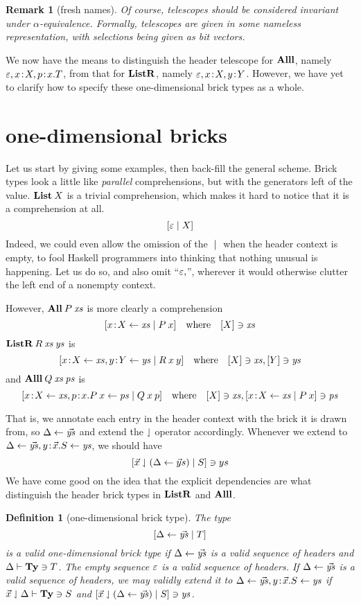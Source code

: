 \documentclass{article}
\newtheorem{defn}[thm]{Definition}
\newtheorem{rem}{Remark}[thm]
\begin{document}
\begin{rem}[fresh names]
  Of course, telescopes should be considered invariant under $\alpha$-equivalence. Formally, telescopes are given in some nameless representation, with selections being given as bit vectors.
\end{rem}

We now have the means to distinguish the header telescope for $\mathbf{Alll}$, namely $\varepsilon,x\!:\! X,p\!:\! x.T$, from that for $\mathbf{ListR}$, namely $\varepsilon,x\!:\! X, y\!:\! Y$. However, we have yet to clarify how to specify these one-dimensional brick types as a whole.


\section{one-dimensional bricks}

Let us start by giving some examples, then back-fill the general scheme. Brick types look a little like \emph{parallel} comprehensions, but with the generators left of the value. $\mathbf{List}\:X$ is a trivial comprehension, which makes it hard to notice that it is a comprehension at all.
\[
  [\varepsilon\;|\; X]
\]
Indeed, we could even allow the omission of the $\;|\;$ when the header context is empty, to fool Haskell programmers into thinking that nothing unusual is happening. Let us do so, and also omit ``$\varepsilon,$'', wherever it would otherwise clutter the left end of a nonempty context.
  
However, $\mathbf{All}\:P\:\mathit{xs}$ is more clearly a comprehension
\[
  [x\!:\! X\leftarrow\mathit{xs}\;|\; P\:x]
  \quad\mbox{where}\quad
  [X]\ni \mathit{xs}
\]
$\mathbf{ListR}\:R\:\mathit{xs}\:\mathit{ys}$ is
\[
  [x\!:\! X\leftarrow\mathit{xs}, y\!:\! Y\leftarrow\mathit{ys}\;|\; R\:x\:y ]
  \quad\mbox{where}\quad
  [X]\ni \mathit{xs}, [Y]\ni \mathit{ys}
\]
and $\mathbf{Alll}\:Q\:\mathit{xs}\:\mathit{ps}$ is
\[
  [x\!:\! X\leftarrow\mathit{xs}, p\!:\! x.P\:x\leftarrow\mathit{ps}\;|\; Q\:x\:p]
  \quad\mbox{where}\quad
  [X]\ni \mathit{xs}, [x\!:\! X\leftarrow\mathit{xs}\;|\; P\:x]\ni \mathit{ps}
\]

That is, we annotate each entry in the header context with the brick it is drawn from, so $\Delta\leftarrow\vec{\mathit{ys}}$ and extend the $\downharpoonleft$ operator accordingly. Whenever we extend to $\Delta\leftarrow\vec{\mathit{ys}},y\!:\!\vec x.S\leftarrow \mathit{ys}$, we should have
\[
  [\vec x\downharpoonleft(\Delta\leftarrow\vec ys)\;|\; S]\ni ys
\]
We have come good on the idea that the explicit dependencies are what distinguish the header brick types in $\mathbf{ListR}$ and $\mathbf{Alll}$.

\begin{defn}[one-dimensional brick type]
  The type
  \[
    [\Delta\leftarrow\vec{\mathit{ys}}\;|\; T]
  \]
  is a valid one-dimensional brick type if $\Delta\leftarrow\vec{\mathit{ys}}$ is a valid sequence of headers and $\Delta\vdash\mathbf{Ty}\ni T$.
  The empty sequence $\varepsilon$ is a valid sequence of headers. If $\Delta\leftarrow\vec{\mathit{ys}}$ is a valid sequence of headers, we may validly extend it to $\Delta\leftarrow\vec{\mathit{ys}},y\!:\!\vec x.S\leftarrow \mathit{ys}$ if $\vec x\downharpoonleft\Delta\vdash \mathbf{Ty}\ni S$ and $[\vec x\downharpoonleft(\Delta\leftarrow\vec{\mathit{ys}})\;|\; S]\ni\mathit{ys}$.
\end{defn}
\end{document}
